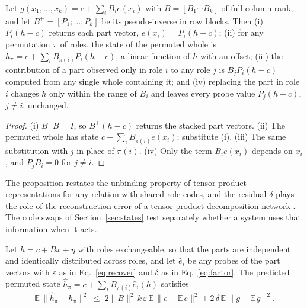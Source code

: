 \noindent

\begin{proposition}
\label{prop:systematic}
Let $g(x_1, \ldots, x_k) = c + \sum_i B_i e(x_i)$ with $B = [B_1 \cdots B_k]$ of full column rank, and let $B^{+} = [P_1; \ldots; P_k]$ be its pseudo-inverse in row blocks. Then (i) $P_i(h - c)$ returns each part vector, $e(x_i) = P_i(h - c)$; (ii) for any permutation $\pi$ of roles, the state of the permuted whole is $h_\pi = c + \sum_i B_{\pi(i)} P_i (h - c)$, a linear function of $h$ with an offset; (iii) the contribution of a part observed only in role $i$ to any role $j$ is $B_j P_i (h - c)$ computed from any single whole containing it; and (iv) replacing the part in role $i$ changes $h$ only within the range of $B_i$ and leaves every probe value $P_j(h - c)$, $j \ne i$, unchanged.
\end{proposition}

\begin{proof}
(i) $B^{+}B = I$, so $B^{+}(h - c)$ returns the stacked part vectors. (ii) The permuted whole has state $c + \sum_i B_{\pi(i)} e(x_i)$; substitute (i). (iii) The same substitution with $j$ in place of $\pi(i)$. (iv) Only the term $B_i e(x_i)$ depends on $x_i$, and $P_j B_i = 0$ for $j \neq i$.
\end{proof}

\noindent
The proposition restates the unbinding property of tensor-product representations \citep{smolensky1990} for any relation with shared role codes, and the residual $\delta$ plays the role of the reconstruction error of a tensor-product decomposition network \citep{mccoy2019}. The code swaps of Section~\ref{sec:states} test separately whether a system uses that information when it acts.

\begin{proposition}
\label{prop:approx}
Let $h = c + Bx + \eta$ with roles exchangeable, so that the parts are independent and identically distributed across roles, and let $\hat{e}_i$ be any probes of the part vectors with $\varepsilon$ as in Eq.~\eqref{eq:recover} and $\delta$ as in Eq.~\eqref{eq:factor}. The predicted permuted state $\hat{h}_\pi = c + \sum_i B_{\pi(i)}\hat{e}_i(h)$ satisfies
\begin{equation}
  \mathbb{E}\,\lVert \hat{h}_\pi - h_\pi \rVert^2 \;\le\; 2\lVert B \rVert^2\, k\,\varepsilon\, \mathbb{E}\,\lVert e - \mathbb{E}\,e \rVert^2 + 2\,\delta\, \mathbb{E}\,\lVert g - \mathbb{E}\,g \rVert^2 .
\end{equation}
\end{proposition}


